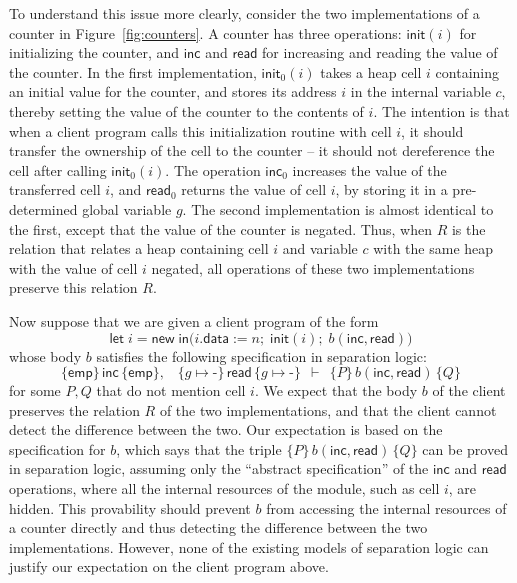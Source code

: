 \documentclass{LMCS}
\newcommand{\new}{\mathsf{new}}
\newcommand{\mlet}[1]{\mathsf{let}\;{#1}\;\mathsf{in}}
\newcommand{\blank}{\mbox{-}}
\newcommand{\emp}{\mathsf{emp}}
\newcommand{\pointsto}{\mapsto}
\newcommand{\ctri}[3]{\{{#1}\}\,{#2}\,\{{#3}\}}
\newcommand{\init}{\mathsf{init}}
\newcommand{\inc}{\mathsf{inc}}
\newcommand{\mread}{\mathsf{read}}
\newcommand{\data}{\mathsf{data}}
\begin{document}
To understand this issue more clearly, 
consider the two implementations of a counter 
in Figure~\ref{fig:counters}.
A counter has three operations: 
$\init(i)$ for initializing the counter, 
and $\inc$ and $\mread$ for increasing and reading
the value of the counter.
In the first implementation, 
$\init_0(i)$
takes a heap cell $i$ containing
an initial value for the counter, and stores its address $i$ 
in the internal variable $c$, thereby setting the value
of the counter to the contents of $i$. The intention is that
when a client program calls this 
initialization routine with cell $i$, it should
transfer the ownership of the cell to the counter -- 
it should not dereference the cell after calling $\init_0(i)$.
The operation $\inc_0$ increases the value of 
the transferred cell $i$, and $\mread_0$ returns
the value of cell $i$, by storing it in a pre-determined
global variable $g$. The second 
implementation is almost identical to the first, except that
the value of the counter is negated. Thus, when
$R$ is the relation that relates a heap containing 
cell $i$ and variable $c$ with the same heap with the value of 
cell $i$
negated, all operations of these two implementations preserve
this relation $R$.

Now suppose that we are given a client program of the form
$$
\mlet{i{=}\new}
\bigl(i.\data{:=}n;\; \init(i);\; b(\inc,\mread)\bigr)
$$
whose body $b$ satisfies the following
specification in separation logic:
$$
  \ctri{\emp}{\inc}{\emp},\;\;\;
  \ctri{g\pointsto\blank}{\mread}{g\pointsto\blank}
  \,\;\vdash\,\;
  \ctri{P}{b(\inc,\mread)}{Q}
$$
for some $P,Q$ that do not mention cell $i$.
We expect that the body $b$ of the client preserves the relation $R$ of the
two implementations, and that the client cannot detect the difference
between the two. Our expectation is based on the specification for $b$,
which says that the triple $\ctri{P}{b(\inc,\mread)}{Q}$ can be proved in
separation logic, assuming only the ``abstract specification'' of the
$\inc$ and $\mread$ operations, where all the internal resources of the
module, such as cell $i$, are hidden. This provability should prevent $b$
from accessing the internal resources of a counter directly and thus
detecting the difference between the two implementations.  However, none of the
existing models of separation logic can justify our expectation on the
client program above.
\end{document}
